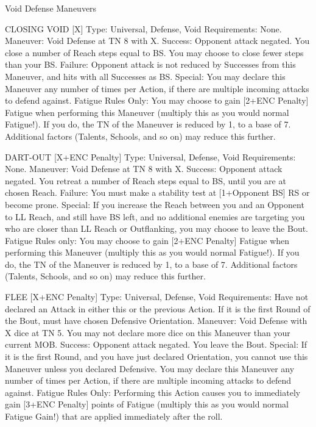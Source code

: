 \documentclass[oneside,11pt,english]{book}
\begin{document}
 

 

Void Defense Maneuvers 


 

CLOSING VOID [X] 
Type: Universal, Defense, Void 
Requirements: None. 
Maneuver: Void Defense at TN 8 with X. 
Success: Opponent attack negated. You close a number of Reach steps equal to BS. You may choose to 
close fewer steps than your BS. 
Failure: Opponent attack is not reduced by Successes from this Maneuver, and hits with all Successes as 
BS. 
Special: You may declare this Maneuver any number of times per Action, if there are multiple incoming 
attacks to defend against. 
Fatigue Rules Only: You may choose to gain [2+ENC Penalty] Fatigue when performing this Maneuver 
(multiply this as you would normal Fatigue!). If you do, the TN of the Maneuver is reduced by 1, to a 
base of 7. Additional factors (Talents, Schools, and so on) may reduce this further. 

 

DART-OUT [X+ENC Penalty] 
Type: Universal, Defense, Void 
Requirements: None. 
Maneuver: Void Defense at TN 8 with X. 
Success: Opponent attack negated. You retreat a number of Reach steps equal to BS, until you are at 
chosen Reach. 
Failure: You must make a stability test at [1+Opponent BS] RS or become prone. 
Special: If you increase the Reach between you and an Opponent to LL Reach, and still have BS left, and 
no additional enemies are targeting you who are closer than LL Reach or Outflanking, you may choose to 
leave the Bout. 
Fatigue Rules only: You may choose to gain [2+ENC Penalty] Fatigue when performing this Maneuver 
(multiply this as you would normal Fatigue!). If you do, the TN of the Maneuver is reduced by 1, to a 
base of 7. Additional factors (Talents, Schools, and so on) may reduce this further. 

 

FLEE [X+ENC Penalty] 
Type: Universal, Defense, Void 
Requirements: Have not declared an Attack in either this or the previous Action. If it is the first Round 
of the Bout, must have chosen Defensive Orientation. 
Maneuver: Void Defense with X dice at TN 5. You may not declare more dice on this Maneuver than 
your current MOB. 
Success: Opponent attack negated. You leave the Bout. 
Special: If it is the first Round, and you have just declared Orientation, you cannot use this Maneuver 
unless you declared Defensive. 
You may declare this Maneuver any number of times per Action, if there are multiple incoming attacks to 
defend against. 
Fatigue Rules Only: Performing this Action causes you to immediately gain [3+ENC Penalty] points of 
Fatigue (multiply this as you would normal Fatigue Gain!) that are applied immediately after the roll. 
\end{document}
